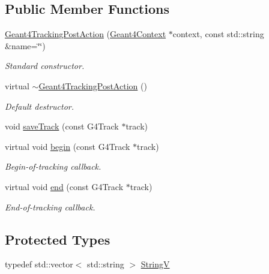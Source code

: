 \subsection*{Public Member Functions}
\begin{DoxyCompactItemize}
\item 
\hyperlink{class_d_d4hep_1_1_simulation_1_1_geant4_tracking_post_action_ae3d8aa2136d0c2604a1704ae8e4193c7}{Geant4TrackingPostAction} (\hyperlink{class_d_d4hep_1_1_simulation_1_1_geant4_context}{Geant4Context} $\ast$context, const std::string \&name=\char`\"{}\char`\"{})
\begin{DoxyCompactList}\small\item\em Standard constructor. \item\end{DoxyCompactList}\item 
virtual \hyperlink{class_d_d4hep_1_1_simulation_1_1_geant4_tracking_post_action_a25395b6df98baa403430c74dfe37b453}{$\sim$Geant4TrackingPostAction} ()
\begin{DoxyCompactList}\small\item\em Default destructor. \item\end{DoxyCompactList}\item 
void \hyperlink{class_d_d4hep_1_1_simulation_1_1_geant4_tracking_post_action_a9ff02148f329e54a340e623d79b1f9c3}{saveTrack} (const G4Track $\ast$track)
\item 
virtual void \hyperlink{class_d_d4hep_1_1_simulation_1_1_geant4_tracking_post_action_a3460d57b0bf474e1b83a3302056cf716}{begin} (const G4Track $\ast$track)
\begin{DoxyCompactList}\small\item\em Begin-\/of-\/tracking callback. \item\end{DoxyCompactList}\item 
virtual void \hyperlink{class_d_d4hep_1_1_simulation_1_1_geant4_tracking_post_action_ac64fbbb53136a1696ac45c060fdcde70}{end} (const G4Track $\ast$track)
\begin{DoxyCompactList}\small\item\em End-\/of-\/tracking callback. \item\end{DoxyCompactList}\end{DoxyCompactItemize}
\subsection*{Protected Types}
\begin{DoxyCompactItemize}
\item 
typedef std::vector$<$ std::string $>$ \hyperlink{class_d_d4hep_1_1_simulation_1_1_geant4_tracking_post_action_ae14809326747530052282a63ea5a362d}{StringV}
\end{DoxyCompactItemize}
